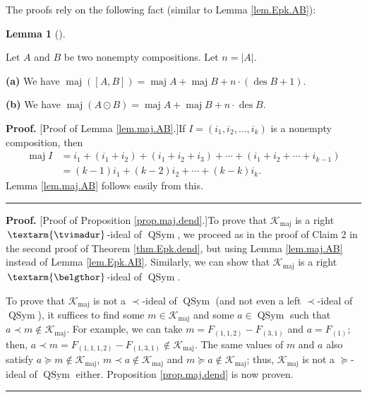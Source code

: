 \documentclass[numbers=enddot,12pt,final,onecolumn,notitlepage]{scrartcl}%
\theoremstyle{definition}
\newtheorem{lem}[theo]{Lemma}
\newenvironment{lemma}[1][]
{\begin{lem}[#1]\begin{leftbar}}
{\end{leftbar}\end{lem}}
\newenvironment{proof}[1][Proof]{\noindent\textbf{#1.} }{\ \rule{0.5em}{0.5em}}
\newenvironment{verlong}{}{}
\newcommand{\tvi}{\left. \textarm{\tvimadur} \right.}
\newcommand{\bel}{\left. \textarm{\belgthor} \right.}
\begin{document}
\begin{verlong}
The proofs rely on the following fact (similar to Lemma \ref{lem.Epk.AB}):

\begin{lemma}
\label{lem.maj.AB}Let $A$ and $B$ be two nonempty compositions. Let
$n=\left\vert A\right\vert $.

\textbf{(a)} We have $\operatorname*{maj}\left(  \left[  A,B\right]  \right)
=\operatorname*{maj}A+\operatorname*{maj}B+n\cdot\left(  \operatorname*{des}%
B+1\right)  $.

\textbf{(b)} We have $\operatorname*{maj}\left(  A\odot B\right)
=\operatorname*{maj}A+\operatorname*{maj}B+n\cdot\operatorname*{des}B$.
\end{lemma}

\begin{proof}
[Proof of Lemma \ref{lem.maj.AB}.]If $I=\left(  i_{1},i_{2},\ldots
,i_{k}\right)  $ is a nonempty composition, then
\begin{align*}
\operatorname*{maj}I  &  =i_{1}+\left(  i_{1}+i_{2}\right)  +\left(
i_{1}+i_{2}+i_{3}\right)  +\cdots+\left(  i_{1}+i_{2}+\cdots+i_{k-1}\right) \\
&  =\left(  k-1\right)  i_{1}+\left(  k-2\right)  i_{2}+\cdots+\left(
k-k\right)  i_{k}.
\end{align*}
Lemma \ref{lem.maj.AB} follows easily from this.
\end{proof}

\begin{proof}
[Proof of Proposition \ref{prop.maj.dend}.]To prove that $\mathcal{K}%
_{\operatorname*{maj}}$ is a right $\tvi$-ideal of $\operatorname*{QSym}$, we
proceed as in the proof of Claim 2 in the second proof of Theorem
\ref{thm.Epk.dend}, but using Lemma \ref{lem.maj.AB} instead of Lemma
\ref{lem.Epk.AB}. Similarly, we can show that $\mathcal{K}%
_{\operatorname*{maj}}$ is a right $\bel$-ideal of $\operatorname*{QSym}$.

To prove that $\mathcal{K}_{\operatorname*{maj}}$ is not a $\left.
\prec\right.  $-ideal of $\operatorname*{QSym}$ (and not even a left $\left.
\prec\right.  $-ideal of $\operatorname*{QSym}$), it suffices to find some
$m\in\mathcal{K}_{\operatorname*{maj}}$ and some $a\in\operatorname*{QSym}$
such that $a\left.  \prec\right.  m\notin\mathcal{K}_{\operatorname*{maj}}$.
For example, we can take $m=F_{\left(  1,1,2\right)  }-F_{\left(  3,1\right)
}$ and $a=F_{\left(  1\right)  }$; then, $a\left.  \prec\right.  m=F_{\left(
1,1,1,2\right)  }-F_{\left(  1,3,1\right)  }\notin\mathcal{K}%
_{\operatorname*{maj}}$. The same values of $m$ and $a$ also satisfy $a\left.
\succeq\right.  m\notin\mathcal{K}_{\operatorname*{maj}}$, $m\left.
\prec\right.  a\notin\mathcal{K}_{\operatorname*{maj}}$ and $m\left.
\succeq\right.  a\notin\mathcal{K}_{\operatorname*{maj}}$; thus,
$\mathcal{K}_{\operatorname*{maj}}$ is not a $\left.  \succeq\right.  $-ideal
of $\operatorname*{QSym}$ either. Proposition \ref{prop.maj.dend} is now proven.
\end{proof}


\end{verlong}
\end{document}
